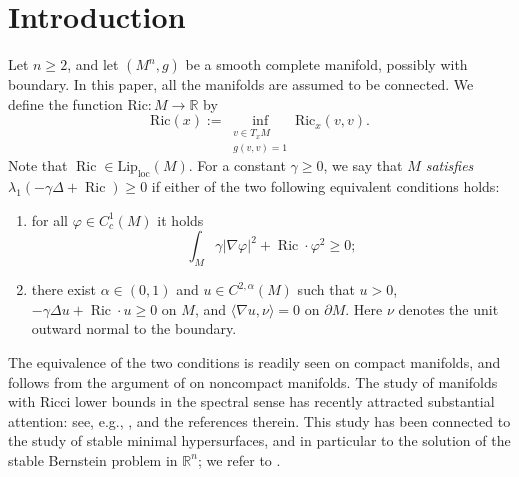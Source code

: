 \documentclass[12pt,a4paper,reqno]{amsart}
\theoremstyle{definition}
\renewcommand{\geq}{\geqslant}
\DeclareMathOperator{\Ric}{Ric}
\newcommand{\D}{\nabla}
\begin{document}
\section{Introduction}
Let $n\geq 2$, and let $(M^n,g)$ be a smooth complete manifold, possibly with boundary. In this paper, all the manifolds are assumed to be connected. We define the function $\mathrm{Ric}:M\to \mathbb R$ by
\[
\mathrm{Ric}(x):=\inf_{\substack{v\in T_xM\\ g(v,v)=1}} \mathrm{Ric}_x(v,v).
\]
Note that $\Ric\in\mathrm{Lip}_{\text{loc}}(M)$. For a constant $\gamma\geq0$, we say that \textit{$M$ satisfies $\lambda_1(-\gamma\Delta+\Ric)\geq0$}
if either of the two following equivalent conditions holds:
\begin{enumerate}[label={(\roman*)}, topsep=2pt, itemsep=1pt]
    \item for all $\varphi\in C^1_c(M)$ it holds 
    \begin{equation}\label{eqn:SpectralRicciCondition}
    \int_M\gamma|\D\varphi|^2+\Ric\cdot\varphi^2\geq0;
    \end{equation}
    \item there exist $\alpha\in (0,1)$ and $u\in C^{2,\alpha}(M)$ such that $u>0$, $-\gamma\Delta u+\Ric\cdot u\geq0$ on $M$, and $\langle \nabla u,\nu\rangle=0$ on $\partial M$. Here $\nu$ denotes the unit outward normal to the boundary. 
\end{enumerate}
The equivalence of the two conditions is readily seen on compact manifolds, and follows from the argument of \cite{Fischer-Colbrie-Schoen} on noncompact manifolds. The study of manifolds with Ricci lower bounds in the spectral sense has recently attracted substantial attention: see, e.g., \cite{APX24, AX24, CatinoMariMastroliaRoncoroni, HongWang, CS26}, and the references therein. This study has been connected to the study of stable minimal hypersurfaces, and in particular to the solution of the stable Bernstein problem in $\mathbb R^n$; we refer to \cite{ChodoshLiBernstein2, CLMS, Mazet, CabreCatinoMariMastroliaRoncoroni}.
\end{document}
